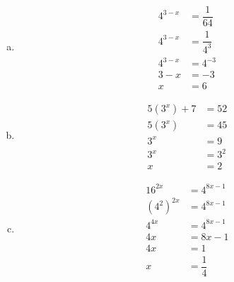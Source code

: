 \documentclass[11pt,letterpaper]{article}
\begin{document}
\sol
\begin{enumerate}[(a)]
\item 
	\[
	\begin{aligned}
	4^{3-x}&= \dfrac{1}{64} \\[0.3cm]
	4^{3-x}&= \dfrac{1}{4^3} \\[0.3cm]
	4^{3-x}&= 4^{-3} \\[0.3cm]
	3 - x&= -3 \\[0.3cm]
	x&= 6
	\end{aligned}
	\] \pspace

\item 
	\[
	\begin{aligned}
	5(3^x) + 7&= 52 \\[0.3cm]
	5(3^x)&= 45 \\[0.3cm]
	3^x&= 9 \\[0.3cm]
	3^x&= 3^2 \\[0.3cm]
	x&= 2
	\end{aligned}
	\] \pspace

\item 
	\[
	\begin{aligned}
	16^{2x}&= 4^{8x - 1} \\[0.3cm]
	(4^2)^{2x}&= 4^{8x - 1} \\[0.3cm]
	4^{4x}&= 4^{8x - 1} \\[0.3cm]
	4x&= 8x - 1 \\[0.3cm]
	4x&= 1 \\[0.3cm]
	x&= \dfrac{1}{4}
	\end{aligned}
	\]
\end{enumerate}
\end{document}
